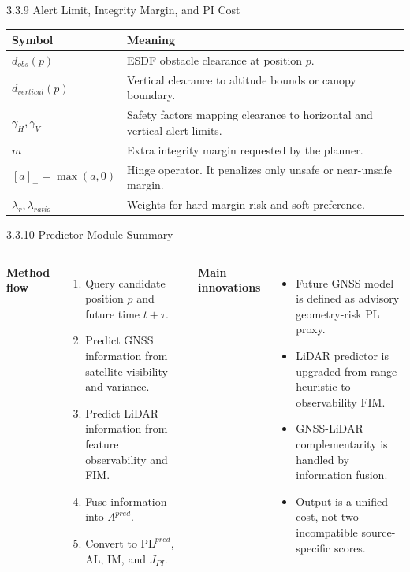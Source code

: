\documentclass[10pt,aspectratio=169,xcolor=dvipsnames]{beamer}
\newcommand{\PL}{\mathrm{PL}}
\newcommand{\AL}{\mathrm{AL}}
\newcommand{\IM}{\mathrm{IM}}
\begin{document}
\begin{frame}{3.3.9 Alert Limit, Integrity Margin, and PI Cost}
  \begin{table}\scriptsize
    \begin{tabular}{p{} p{}}
      \toprule
      \textbf{Symbol} & \textbf{Meaning}\\
      \midrule
      $d_{obs}(p)$ & ESDF obstacle clearance at position $p$.\\
      $d_{vertical}(p)$ & Vertical clearance to altitude bounds or canopy boundary.\\
      $\gamma_H,\gamma_V$ & Safety factors mapping clearance to horizontal and vertical alert limits.\\
      $m$ & Extra integrity margin requested by the planner.\\
      $[a]_+=\max(a,0)$ & Hinge operator. It penalizes only unsafe or near-unsafe margin.\\
      $\lambda_r,\lambda_{ratio}$ & Weights for hard-margin risk and soft preference.\\
      \bottomrule
    \end{tabular}
  \end{table}
\end{frame}

\begin{frame}{3.3.10 Predictor Module Summary}
  \small
  \begin{columns}[T]
    \textbf{Method flow}
    \begin{enumerate}\footnotesize
      \item Query candidate position $p$ and future time $t+\tau$.
      \item Predict GNSS information from satellite visibility and variance.
      \item Predict LiDAR information from feature observability and FIM.
      \item Fuse information into $\Lambda^{pred}$.
      \item Convert to $\PL^{pred}$, $\AL$, $\IM$, and $J_{PI}$.
    \end{enumerate}

    \textbf{Main innovations}
    \begin{itemize}\footnotesize
      \item Future GNSS model is defined as advisory geometry-risk PL proxy.
      \item LiDAR predictor is upgraded from range heuristic to observability FIM.
      \item GNSS-LiDAR complementarity is handled by information fusion.
      \item Output is a unified cost, not two incompatible source-specific scores.
    \end{itemize}
  \end{columns}
\end{frame}
\end{document}
